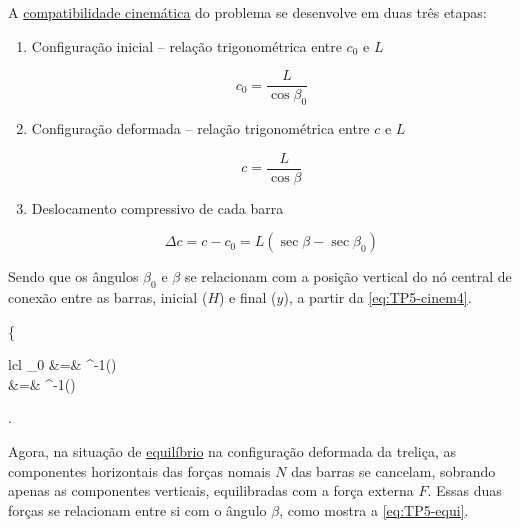 \begin{textocaixa}
\hspace{10mm}

A \underline{compatibilidade cinemática} do problema se desenvolve em duas três etapas:

\begin{enumerate}
	\item Configuração inicial -- relação trigonométrica entre $c_0$ e $L$
	
	\begin{equation}
		c_0 = \frac{L}{\cos\beta_0}
		\label{eq:TP5-cinem1}
	\end{equation}

	\item Configuração deformada -- relação trigonométrica entre $c$ e $L$
	
	\begin{equation}
		c = \frac{L}{\cos\beta}
		\label{eq:TP5-cinem2}
	\end{equation}

	\item Deslocamento compressivo de cada barra
	
	\begin{equation}
		\Delta c = c - c_0 = L\left(\sec\beta - \sec\beta_0\right)
		\label{eq:TP5-cinem3}
	\end{equation}
\end{enumerate}

Sendo que os ângulos $\beta_0$ e $\beta$ se relacionam com a posição vertical do nó central
de conexão entre as barras, inicial ($H$) e final ($y$), a partir da \autoref{eq:TP5-cinem4}.

\begin{bigEquation}
	\left\{\begin{array}{lcl}
		\beta_0 &=& \tan^{-1}\left(\right) \\ [10pt]
		\beta   &=& \tan^{-1}\left(\right) \\
	\end{array}\right.
	\label{eq:TP5-cinem4}
\end{bigEquation}

Agora, na situação de \underline{equilíbrio} na configuração deformada da treliça, as
componentes horizontais das forças nomais $N$ das barras se cancelam, sobrando apenas as
componentes verticais, equilibradas com a força externa $F$. Essas duas forças se relacionam
entre si com o ângulo $\beta$, como mostra a \autoref{eq:TP5-equi}.


\end{textocaixa}
